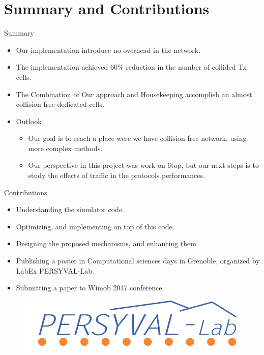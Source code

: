 \section{Summary and Contributions}
\begin{withoutheadline}
\begin{frame}{Summary}
  \begin{itemize}
  \item
    Our implementation introduce  \alert{no overhead } in the network.
  \item
    The implementation \alert{achieved 60\% reduction} in the number of collided Tx cells.
  \item The Combination of Our approach and Housekeeping accomplish an \alert{ almost collision free dedicated cells}.
  \end{itemize}
  
  \begin{itemize}
  \item
    Outlook
    \begin{itemize}
    \item
     Our goal is to reach a place were we have collision free network, using more complex methods.
    \item
      Our perspective in this project was work on 6top, but our next steps is to study the effects of traffic in the protocols performances.
    \end{itemize}
  \end{itemize}
\end{frame}
\end{withoutheadline}


\begin{withoutheadline}
\begin{frame}{Contributions}
  \begin{itemize}
  \item Understanding the simulator code.
  \item Optimizing, and implementing on top of this code.
  \item Designing the proposed mechanisms, and enhancing them.
  \item Publishing a poster in Computational sciences days in Grenoble, organized by LabEx PERSYVAL-Lab.
  \item Submitting a paper to Wimob 2017 conference. 
  \end{itemize}
  \begin{figure}[p]
\centering
\includegraphics[width=.5\linewidth]{figures/per.png}

\end{figure}
\end{frame}
\end{withoutheadline}